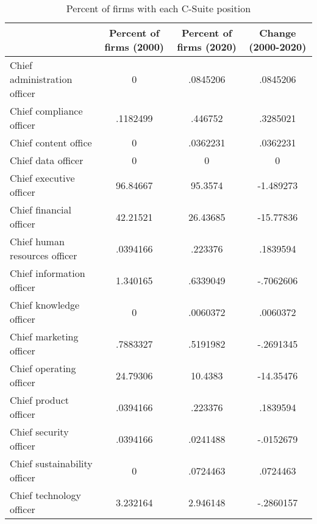 \begin{table}[htbp]\centering
\caption{Percent of firms with each C-Suite position\label{tab98}}
\begin{tabular}{l*{3}{c}}
\toprule
                    &Percent of firms (2000)&Percent of firms (2020)&Change (2000-2020)\\
\midrule
Chief administration officer&           0&    .0845206&    .0845206\\
Chief compliance officer&    .1182499&     .446752&    .3285021\\
Chief content office&           0&    .0362231&    .0362231\\
Chief data officer  &           0&           0&           0\\
Chief executive officer&    96.84667&     95.3574&   -1.489273\\
Chief financial officer&    42.21521&    26.43685&   -15.77836\\
Chief human resources officer&    .0394166&     .223376&    .1839594\\
Chief information officer&    1.340165&    .6339049&   -.7062606\\
Chief knowledge officer&           0&    .0060372&    .0060372\\
Chief marketing officer&    .7883327&    .5191982&   -.2691345\\
Chief operating officer&    24.79306&     10.4383&   -14.35476\\
Chief product officer&    .0394166&     .223376&    .1839594\\
Chief security officer&    .0394166&    .0241488&   -.0152679\\
Chief sustainability officer&           0&    .0724463&    .0724463\\
Chief technology officer&    3.232164&    2.946148&   -.2860157\\
\bottomrule
\end{tabular}
\end{table}
